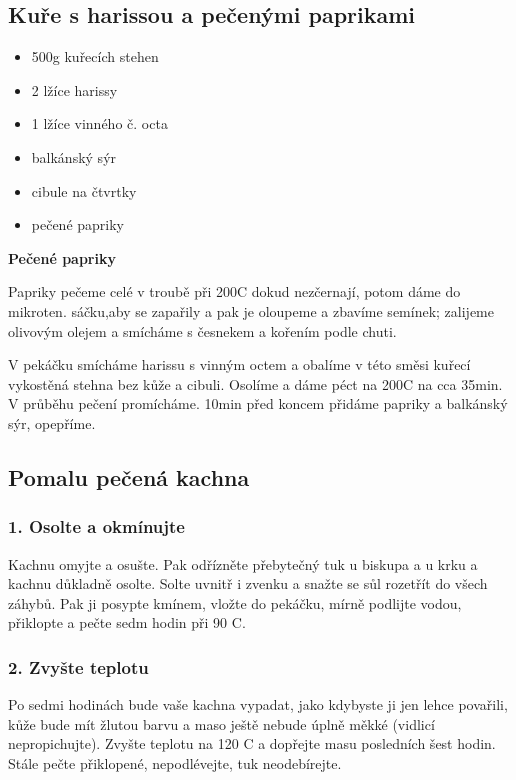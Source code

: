 \documentclass[10pt,a4paper]{article}
\newenvironment{myitemize}
{ \begin{itemize}
    \setlength{\itemsep}{0pt}
    \setlength{\parskip}{0pt}
    \setlength{\parsep}{0pt}     }
{ \end{itemize}                  }
\begin{document}
\subsection{Kuře s harissou a pečenými paprikami}
\begin{minipage}[t]{0,5\textwidth}
\begin{myitemize} 
\item 500g kuřecích stehen
\item 2 lžíce harissy
\item 1 lžíce vinného č. octa
\item balkánský sýr
\item cibule na čtvrtky
\item pečené papriky
\end{myitemize}
\end{minipage}
\begin{minipage}[t]{0,5\textwidth}
\textbf{Pečené papriky}

Papriky pečeme celé v troubě při 200\degree C dokud nezčernají, potom dáme do mikroten. sáčku,aby se zapařily a pak je oloupeme a zbavíme semínek; zalijeme olivovým olejem a smícháme s česnekem a kořením podle chuti.

V pekáčku smícháme harissu s vinným octem a obalíme v této směsi kuřecí vykostěná stehna bez kůže a cibuli. Osolíme a dáme péct na 200\degree C na cca 35min. V průběhu pečení promícháme. 10min před koncem přidáme papriky a balkánský sýr, opepříme.
\end{minipage}
\subsection{Pomalu pečená kachna}
\subsubsection*{1. Osolte a okmínujte}
 Kachnu omyjte a osušte. Pak odřízněte přebytečný tuk u biskupa a u krku a kachnu důkladně osolte. Solte uvnitř i zvenku a snažte se sůl rozetřít do všech záhybů. Pak ji posypte kmínem, vložte do pekáčku, mírně podlijte vodou, přiklopte a pečte sedm hodin při 90 \degree C.

\subsubsection*{2. Zvyšte teplotu}
 Po sedmi hodinách bude vaše kachna vypadat, jako kdybyste ji jen lehce povařili, kůže bude mít žlutou barvu a maso ještě nebude úplně měkké (vidlicí nepropichujte). Zvyšte teplotu na 120 \degree C a dopřejte masu posledních šest hodin. Stále pečte přiklopené, nepodlévejte, tuk neodebírejte.
\end{document}
